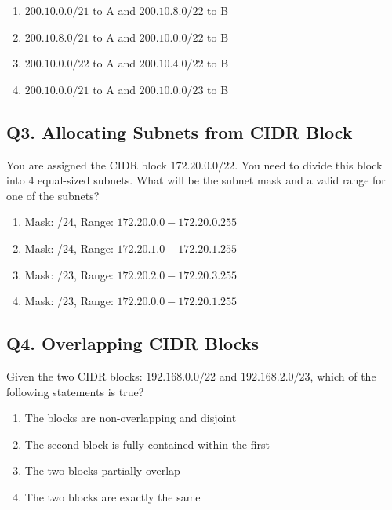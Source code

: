 \begin{enumerate}[label=(\alph*)]
    \item $200.10.0.0/21$ to A and $200.10.8.0/22$ to B  
    \item $200.10.8.0/21$ to A and $200.10.0.0/22$ to B  
    \item $200.10.0.0/22$ to A and $200.10.4.0/22$ to B  
    \item $200.10.0.0/21$ to A and $200.10.0.0/23$ to B  
\end{enumerate}

\vspace{1em}

\subsection*{Q3. Allocating Subnets from CIDR Block}
You are assigned the CIDR block $172.20.0.0/22$. You need to divide this block into 4 equal-sized subnets. What will be the subnet mask and a valid range for one of the subnets?

\begin{enumerate}[label=(\alph*)]
    \item Mask: /24, Range: $172.20.0.0 - 172.20.0.255$  
    \item Mask: /24, Range: $172.20.1.0 - 172.20.1.255$  
    \item Mask: /23, Range: $172.20.2.0 - 172.20.3.255$  
    \item Mask: /23, Range: $172.20.0.0 - 172.20.1.255$  
\end{enumerate}

\vspace{1em}

\subsection*{Q4. Overlapping CIDR Blocks}
Given the two CIDR blocks: $192.168.0.0/22$ and $192.168.2.0/23$, which of the following statements is true?

\begin{enumerate}[label=(\alph*)]
    \item The blocks are non-overlapping and disjoint  
    \item The second block is fully contained within the first  
    \item The two blocks partially overlap  
    \item The two blocks are exactly the same  
\end{enumerate}
